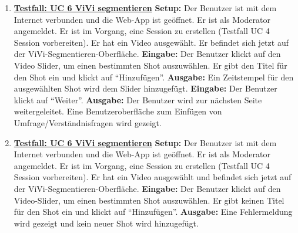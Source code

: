 \begin{enumerate}
	\item \underline{\textbf{Testfall: UC 6 ViVi segmentieren}} \linebreak
	\textbf{Setup:} Der Benutzer ist mit dem Internet verbunden und die Web-App ist geöffnet. Er ist als Moderator angemeldet. Er ist im Vorgang, eine Session zu erstellen (Testfall UC 4 Session vorbereiten). Er hat ein Video ausgewählt. Er befindet sich jetzt auf der ViVi-Segmentieren-Oberfläche.\linebreak
	\textbf{Eingabe:} Der Benutzer klickt auf den Video Slider, um einen bestimmten Shot auszuwählen. Er gibt den Titel für den Shot ein und klickt auf ``Hinzufügen''. \linebreak
	\textbf{Ausgabe:} Ein Zeitstempel für den ausgewählten Shot wird dem Slider hinzugefügt.\linebreak
	\textbf{Eingabe:} Der Benutzer klickt auf ``Weiter''. \linebreak
	\textbf{Ausgabe:} Der Benutzer wird zur nächsten Seite weitergeleitet. Eine Benutzeroberfläche zum Einfügen von Umfrage/Verständnisfragen wird gezeigt.
	
	\item \underline{\textbf{Testfall: UC 6 ViVi segmentieren}} \linebreak
	\textbf{Setup:} Der Benutzer ist mit dem Internet verbunden und die Web-App ist geöffnet. Er ist als Moderator angemeldet. Er ist im Vorgang, eine Session zu erstellen (Testfall UC 4 Session vorbereiten). Er hat ein Video ausgewählt und befindet sich jetzt auf der ViVi-Segmentieren-Oberfläche.\linebreak
	\textbf{Eingabe:} Der Benutzer klickt auf den Video-Slider, um einen bestimmten Shot auszuwählen. Er gibt keinen Titel für den Shot ein und klickt auf ``Hinzufügen''. \linebreak
	\textbf{Ausgabe:} Eine Fehlermeldung wird gezeigt und kein neuer Shot wird hinzugefügt.
	

\end{enumerate}
